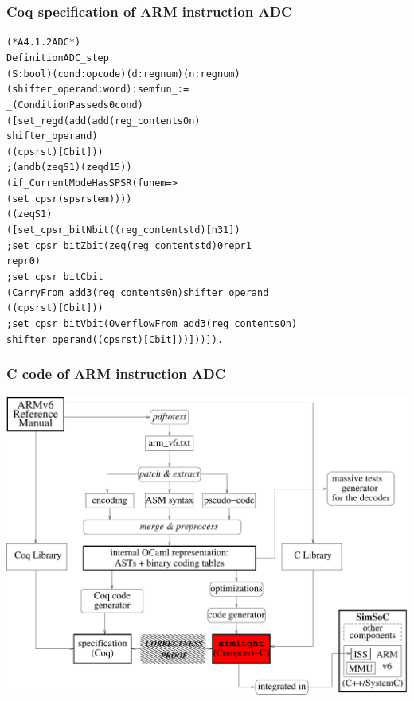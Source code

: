 \documentclass[usenames,dvipsnames]{beamer} %
\begin{document}
\begin{frame}[fragile]
\frametitle{Coq specification of ARM instruction ADC}
\small
\begin{alltt}
(* A4.1.2 ADC *)
Definition ADC_step
    (S : bool) (cond : opcode) (d : regnum) (n : regnum)
    (shifter_operand : word) : semfun _ := 
   _ (ConditionPassed s0 cond)
    ([  set_reg d (add (add (reg_content s0 n)
                                shifter_operand)
                                ((cpsr st)[Cbit]))
    ;  (andb (zeq S 1) (zeq d 15))
           ( if_CurrentModeHasSPSR (fun em =>
              ( set_cpsr (spsr st em))))
\tiny
                     ( (zeq S 1)
                ([  set_cpsr_bit Nbit ((reg_content st d)[n31])
                ;  set_cpsr_bit Zbit ( zeq (reg_content st d) 0  repr 1 
                                           repr 0)
                ;  set_cpsr_bit Cbit
                          (CarryFrom_add3 (reg_content s0 n) shifter_operand
                                          ((cpsr st)[Cbit]))
                ;  set_cpsr_bit Vbit (OverflowFrom_add3 (reg_content s0 n)
                                     shifter_operand ((cpsr st)[Cbit])) ])) ]).
\end{alltt}
\end{frame}


\begin{frame}
\frametitle{C code of ARM instruction ADC}
\hfil\includegraphics[width=.9\linewidth]{fig/highlight_concrete.pdf}
\end{frame}
\end{document}
